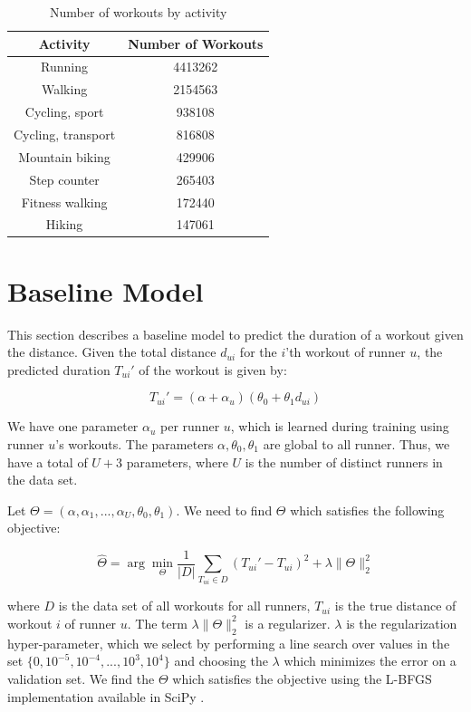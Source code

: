 \documentclass{acm_proc_article-sp}
\begin{document}
\begin{table}[h]
\centering
\begin{tabular}{|c|c|} \hline
\bf{Activity} & \bf{Number of Workouts}  \\ \hline
Running  &           4413262 \\ \hline
Walking  &           2154563 \\ \hline
Cycling, sport  &     938108 \\ \hline
Cycling, transport & 816808 \\ \hline
Mountain biking  &   429906 \\ \hline
Step counter     &   265403 \\ \hline
Fitness walking   &  172440 \\ \hline
Hiking &   147061 \\ \hline
\end{tabular}
\caption{Number of workouts by activity}
\label{tableStatsByActivity}
\end{table}


\section{Baseline Model}
\label{secBaselineModel}
This section describes a baseline model to predict the duration of a workout given the distance. Given the total distance $d_{ui}$ for the $i$'th workout of runner $u$, the predicted duration $T_{ui}'$ of the workout is given by:

\begin{equation}
\label{eqnBaselineDuration}
T_{ui}' = (\alpha + \alpha_{u})(\theta_0 + \theta_1 d_{ui})
\end{equation}

We have one parameter $\alpha_u$ per runner $u$, which is learned during training using runner $u$'s workouts. The parameters $\alpha, \theta_0, \theta_1$ are global to all runner. Thus, we have a total of $U + 3$ parameters, where $U$ is the number of distinct runners in the data set. 

Let $\Theta = (\alpha, \alpha_1, ... , \alpha_U, \theta_0, \theta_1)$. We need to find $\Theta$ which satisfies the following objective:

$$\hat{\Theta} = \arg\min_{\Theta}\frac{1}{|D|} \sum_{T_{ui} \in D}(T_{ui}' - T_{ui})^2 + \lambda \|\Theta \|_2^2 $$

where $D$ is the data set of all workouts for all runners, $T_{ui}$ is the true distance of workout $i$ of runner $u$. The term $\lambda \|\Theta \|_2^2$ is a regularizer. $\lambda$ is the regularization hyper-parameter, which we select by performing a line search over values in the set $\{0, 10^{-5}, 10^{-4},...,10^3, 10^{4}\}$ and choosing the $\lambda$ which minimizes the error on a validation set. We find the $\Theta$ which satisfies the objective using the L-BFGS \cite{lbfgs} implementation available in SciPy \cite{scipy}.
\end{document}
